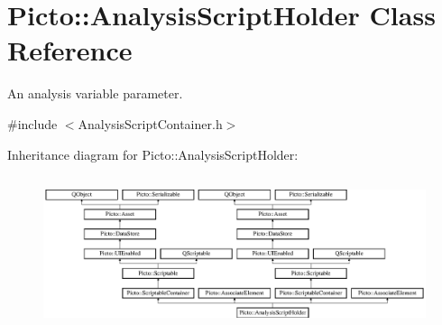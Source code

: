 \hypertarget{class_picto_1_1_analysis_script_holder}{\section{Picto\-:\-:Analysis\-Script\-Holder Class Reference}
\label{class_picto_1_1_analysis_script_holder}
}


An analysis variable parameter.  




{\ttfamily \#include $<$Analysis\-Script\-Container.\-h$>$}

Inheritance diagram for Picto\-:\-:Analysis\-Script\-Holder\-:\begin{figure}[H]
\begin{center}
\leavevmode
\includegraphics[height=4.531792cm]{class_picto_1_1_analysis_script_holder}
\end{center}
\end{figure}
